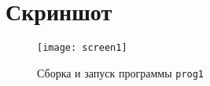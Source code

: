 \section{Скриншот}

\begin{figure}[H]
  \centering
  \texttt{[image: screen1]}
  \caption{Сборка и запуск программы \texttt{prog1}}
\end{figure}

